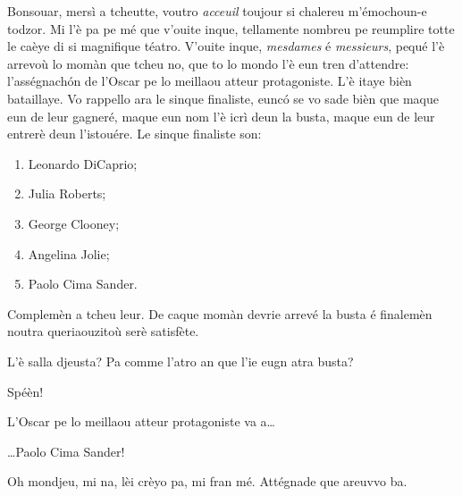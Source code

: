 \begin{drama}
\Conducteurspeaks Bonsouar, mersì a tcheutte, voutro \textit{acceuil} toujour si chalereu m'émochoun-e todzor. Mi l'è pa pe mé que v'ouite inque, tellamente nombreu pe reumplire totte le caèye di si magnifique téatro. V'ouite inque, \textit{mesdames} é \textit{messieurs}, pequé l'è arrevoù lo momàn que tcheu no, que to lo mondo l'è eun tren d'attendre: l'asségnach\'on de l'Oscar pe lo meillaou atteur protagoniste. L'è itaye bièn bataillaye. Vo rappello ara le sinque finaliste, euncó se vo sade bièn que maque eun de leur gagneré, maque eun nom l'è icrì deun la busta, maque eun de leur entrerè deun l'istouére. Le sinque finaliste son:
\begin{enumerate}
\item Leonardo DiCaprio;
\item Julia Roberts;
\item George Clooney;
\item Angelina Jolie;
\item Paolo Cima Sander.
\end{enumerate}

Complemèn a tcheu leur. De caque momàn devrie arrevé la busta é finalemèn noutra queriaouzitoù serè satisfète.


\Conducteurspeaks{} L'è salla djeusta? Pa comme l'atro an que l'ie eugn atra busta?

\Vallettaspeaks Spéèn!

\Conducteurspeaks L'Oscar pe lo meillaou atteur protagoniste va a\ldots


\Conducteurspeaks \ldots Paolo Cima Sander!


\Cimaspeaks{} Oh mondjeu, mi na, lèi crèyo pa, mi fran mé. Attégnade que areuvvo ba. 


\label{katchi}



\end{drama}
